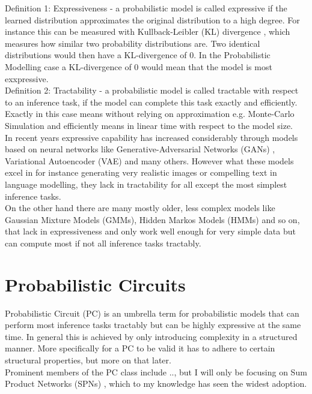 Definition 1: Expressiveness - a probabilistic model is called expressive if the learned distribution approximates the original distribution to a high degree.
For instance this can be measured with Kullback-Leibler (KL) divergence \cite{kl_divergence}, which measures how similar two probability distributions are. 
Two identical distributions would then have a KL-divergence of $0$. In the Probabilistic Modelling case a KL-divergence of 0 would mean that the model is most exxpressive. \\

Definition 2: Tractability - a probabilistic model is called tractable with respect to an inference task, if the model can complete this 
task exactly and efficiently. Exactly in this case means without relying on approximation e.g. Monte-Carlo Simulation and efficiently 
means in linear time with respect to the model size. \\

In recent years expressive capability has increased considerably through models based on neural networks like Generative-Adversarial
Networks (GANs) \cite{gan}, Variational Autoencoder (VAE) \cite{vae} and many others. However what these models excel in for instance generating 
very realistic images or compelling text in language modelling, they lack in tractability for all except the most simplest inference tasks. 
\cite{pc_intro} \\

On the other hand there are many mostly older, less complex models like Gaussian Mixture Models (GMMs), Hidden Markos Models (HMMs) and so on, 
that lack in expressiveness and only work well enough for very simple data but can compute most if not all inference tasks tractably.

\section{Probabilistic Circuits}
\label{sec:pc}

Probabilistic Circuit (PC) is an umbrella term for probabilistic models that can perform most inference tasks tractably but can be 
highly expressive at the same time. In general this is achieved by only introducing complexity in a structured manner. More specifically
for a PC to be valid it has to adhere to certain structural properties, but more on that later. \\

Prominent members of the PC class include .., but I will only be focusing on Sum Product Networks (SPNs) \cite{spn}, which to my 
knowledge has seen the widest adoption. 

